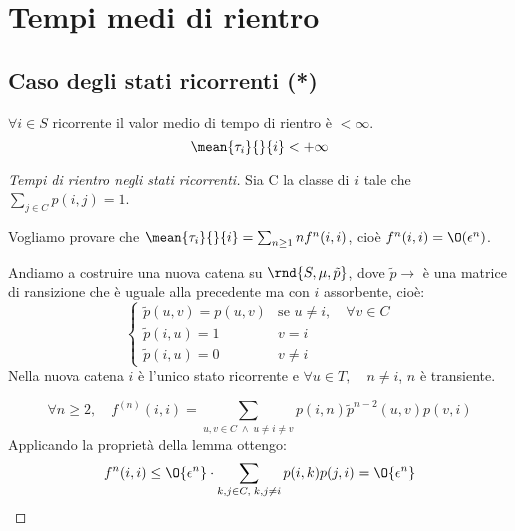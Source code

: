 \documentclass[\main/main.tex]{subfiles}
\begin{document}
\section{Tempi medi di rientro}
\subsection{Caso degli stati ricorrenti (*)}
\begin{theorem}
  \(\forall i \in S\) ricorrente il valor medio di tempo di rientro è \(< \infty\).
  \[
    \mean{\tau_i}{}{i} < + \infty
  \]
\end{theorem}
\begin{proof}[Tempi di rientro negli stati ricorrenti]
  Sia C la classe di \(i\) tale che \(\sum_{j \in C} p(i,j) = 1\).

  Vogliamo provare che \(\mean{\tau_i}{}{i} = \sum_{n \geq 1} n f^n(i,i)\), cioè \(f^n(i,i) = \O(\epsilon^n)\).

  Andiamo a costruire una nuova catena su \(\rnd{S, \mu, \tilde{p}}\), dove \(\tilde{p} \rightarrow\) è una matrice di ransizione che è uguale alla precedente ma con \(i\) assorbente, cioè:
  \[
    \begin{cases}
      \tilde{p}(u,v) = p(u,v) & \text{se } u\neq i, \quad \forall v \in C \\
      \tilde{p}(i,u) = 1      & v = i                                     \\
      \tilde{p}(i,u) = 0      & v \neq i
    \end{cases}
  \]
  Nella nuova catena \(i\) è l'unico stato ricorrente e \(\forall u \in T, \quad n\neq i\), \(n\) è transiente.

  \[
    \forall n \geq 2, \quad f^{(n)}(i,i) = \sum_{u,v \in C \; \land \; u \neq i \neq v} p(i,n) \tilde{p}^{n - 2} (u,v) p(v, i)
  \]
  Applicando la proprietà della lemma ottengo:
  \[
    f^n (i,i) \leq \O{\epsilon^n} \cdot \sum_{k,j \in C, \;k,j \neq i} p(i,k)p(j,i) = \O{\epsilon^n}
  \]
\end{proof}
\end{document}
